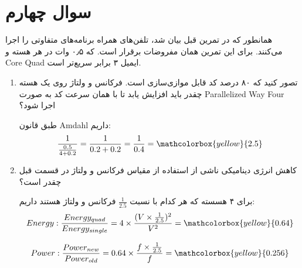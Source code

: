\section{سوال چهارم}

همانطور که در تمرین قبل بیان شد، تلفن‌های همراه برنامه‌های متفاوتی را اجرا می‌کنند. برای این تمرین همان مفروضات برقرار است. که ۰٫۵ وات در هر هسته و Core Quad ایمیل ۳ برابر سریع‌تر است.


\begin{enumerate}
	\item تصور کنید که ۸۰ درصد کد قابل موازی‌سازی است. فرکانس و ولتاژ روی یک هسته چقدر باید افزایش یابد تا با همان سرعت کد به صورت Parallelized Way Four اجرا شود؟
	\begin{qsolve}
طبق قانون Amdahl داریم:
	\begin{equation}
		\frac{1}{\frac{0.5}{4+0.2}} = \frac{1}{0.2+0.2} = \frac{1}{0.4} = \mathcolorbox{yellow}{2.5}
	\end{equation}
	\end{qsolve}







	\item کاهش انرژی دینامیکی ناشی از استفاده از مقیاس فرکانس و ولتاژ در قسمت قبل چقدر است؟
	\begin{qsolve}
برای ۴ هسسته که هر کدام با نسبت $\frac{1}{2.5}$ فرکانس و ولتاژ هستند داریم:
	\begin{equation}
		Energy: \frac{Energy_{quad}}{Energy_{single}} = 4 \times \frac{(V \times \frac{1}{2.5})^2}{V^2}=\mathcolorbox{yellow}{0.64}
	\end{equation}
	
	\begin{equation}
		Power: \frac{Power_{new}}{Power_{old}} = 0.64 \times \frac{f \times \frac{1}{2.5}}{f}=\mathcolorbox{yellow}{0.256}
	\end{equation}
	\end{qsolve}








\end{enumerate}
